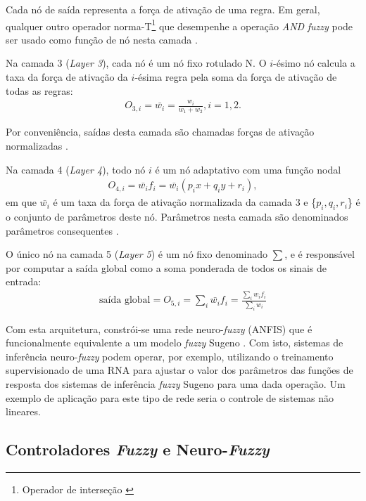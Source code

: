 Cada nó de saída representa a força de ativação de uma regra. Em geral, qualquer outro operador norma-T\footnote{Operador de interseção \cite[p.~337]{Jang1997}} que desempenhe a operação \textit{AND} \textit{fuzzy} pode ser usado como função de nó nesta camada \cite[p.~337]{Jang1997}.

Na camada 3 (\textit{Layer 3}), cada nó é um nó fixo rotulado N. O $i$-ésimo nó calcula a taxa da força de ativação da $i$-ésima regra pela soma da força de ativação de todas as regras:
\begin{align*}
    O_{3,i} = \bar{w_i} = \frac{w_i}{w_1 + w_2}, i = 1, 2.
\end{align*}

Por conveniência, saídas desta camada são chamadas forças de ativação normalizadas \cite[p.~336]{Jang1997}.

Na camada 4 (\textit{Layer 4}), todo nó $i$ é um nó adaptativo com uma função nodal
\begin{align*}
    O_{4,i} = \bar{w_i}f_i = \bar{w_i}(p_ix+q_iy+r_i),
\end{align*}
em que $\bar{w_i}$ é um taxa da força de ativação normalizada da camada 3 e \{$p_i, q_i, r_i$\} é o conjunto de parâmetros deste nó. Parâmetros nesta camada são denominados parâmetros consequentes \cite[p.~336]{Jang1997}.

O único nó na camada 5 (\textit{Layer 5}) é um nó fixo denominado $\sum$, e é responsável por computar a saída global como a soma ponderada de todos os sinais de entrada:
\begin{align*}
    \mbox{saída global} = O_{5,i} = \sum_{i} {\bar{w_i}f_i} = \frac{\sum_{i} {w_if_i}}{\sum_{i} {w_i}} %
\end{align*}

Com esta arquitetura, constrói-se uma rede neuro-\textit{fuzzy} (ANFIS) que é funcionalmente equivalente a um modelo \textit{fuzzy} Sugeno \cite{Jang1997}. Com isto, sistemas de inferência neuro-\textit{fuzzy} podem operar, por exemplo, utilizando o treinamento supervisionado de uma RNA para ajustar o valor dos parâmetros das funções de resposta dos sistemas de inferência \textit{fuzzy} Sugeno para uma dada operação. Um exemplo de aplicação para este tipo de rede seria o controle de sistemas não lineares.

\subsection{Controladores \textit{Fuzzy} e Neuro-\textit{Fuzzy}}

